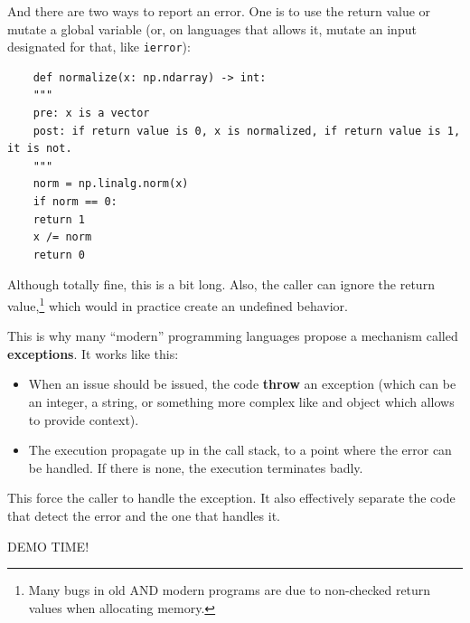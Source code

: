 \documentclass[10pt,
aspectratio=169
]{beamer}
\begin{document}
\begin{frame}[fragile]
And there are two ways to report an error. One is to use the return value or mutate a global variable (or, on languages that allows it, mutate an input designated for that, like \texttt{ierror}):\begin{verbatim}
	def normalize(x: np.ndarray) -> int:
	"""
	pre: x is a vector
	post: if return value is 0, x is normalized, if return value is 1, it is not.
	"""
	norm = np.linalg.norm(x)
	if norm == 0:
	return 1
	x /= norm
	return 0
\end{verbatim}
Although totally fine, this is a bit long. Also, the caller can ignore the return value,\footnote{Many bugs in old AND modern programs are due to non-checked return values when allocating memory.} which would in practice create an undefined behavior.
\vspace{1em}
\end{frame}

\begin{frame}
This is why many ``modern'' programming languages propose a mechanism called \textbf{exceptions}.  It works like this:\begin{itemize}
	\item When an issue should be issued, the code \textbf{throw} an exception (which can be an integer, a string, or something more complex like and object which allows to provide context).
	\item The execution propagate up in the call stack, to a point where the error can be handled. If there is none, the execution terminates badly.
\end{itemize}
This force the caller to handle the exception. It also effectively separate the code that detect the error and the one that handles it.
\end{frame}

\begin{frame}
\begin{center}
	{\LARGE DEMO TIME!}
\end{center}
\end{frame}
\end{document}
